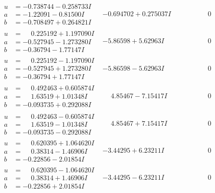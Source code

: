 \documentclass[1p]{elsarticle_modified}
\theoremstyle{definition}
\begin{document}
$$\begin{array}{c|c|c}
\begin{aligned}
u &= -0.738744 - 0.258733 I \\
a &= -1.22091 - 0.81500 I \\
b &= -0.708497 + 0.264821 I\end{aligned}
 & -0.694702 + 0.275037 I & \phantom{-0.000000 } 0 \\ \hline\begin{aligned}
u &= \phantom{-}0.225192 + 1.197090 I \\
a &= -0.527945 - 1.273280 I \\
b &= -0.36794 - 1.77147 I\end{aligned}
 & -5.86598 + 5.62963 I & \phantom{-0.000000 } 0 \\ \hline\begin{aligned}
u &= \phantom{-}0.225192 - 1.197090 I \\
a &= -0.527945 + 1.273280 I \\
b &= -0.36794 + 1.77147 I\end{aligned}
 & -5.86598 - 5.62963 I & \phantom{-0.000000 } 0 \\ \hline\begin{aligned}
u &= \phantom{-}0.492463 + 0.605874 I \\
a &= \phantom{-}1.63519 + 1.01348 I \\
b &= -0.093735 + 0.292088 I\end{aligned}
 & \phantom{-}4.85467 - 7.15417 I & \phantom{-0.000000 } 0 \\ \hline\begin{aligned}
u &= \phantom{-}0.492463 - 0.605874 I \\
a &= \phantom{-}1.63519 - 1.01348 I \\
b &= -0.093735 - 0.292088 I\end{aligned}
 & \phantom{-}4.85467 + 7.15417 I & \phantom{-0.000000 } 0 \\ \hline\begin{aligned}
u &= \phantom{-}0.620395 + 1.064620 I \\
a &= \phantom{-}0.38314 - 1.46906 I \\
b &= -0.22856 - 2.01854 I\end{aligned}
 & -3.44295 + 6.23211 I & \phantom{-0.000000 } 0 \\ \hline\begin{aligned}
u &= \phantom{-}0.620395 - 1.064620 I \\
a &= \phantom{-}0.38314 + 1.46906 I \\
b &= -0.22856 + 2.01854 I\end{aligned}
 & -3.44295 - 6.23211 I & \phantom{-0.000000 } 0 \\ \hline\begin{aligned}

\end{aligned}
\end{array}$$
\end{document}
